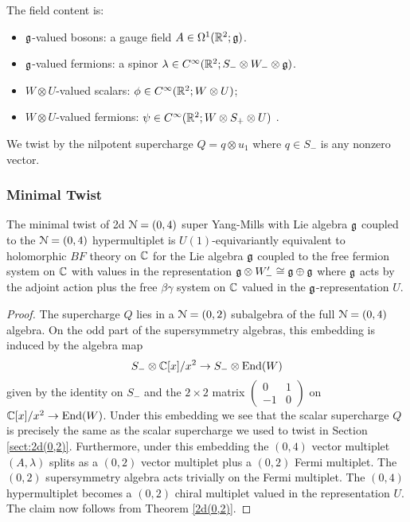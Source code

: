 \documentclass[10pt, oneside]{article}
\begin{document}
The field content is:
\begin{itemize}
\item $\mathfrak g$-valued bosons: a gauge field $A \in \Omega^1(\mathbb R^2;\mathfrak g)$.
\item $\mathfrak g$-valued fermions: a spinor $\lambda \in C^\infty(\mathbb R^2 ; S_- \otimes W_- \otimes \mathfrak g)$. 
\item $W \otimes U$-valued scalars: $\phi \in C^\infty(\mathbb R^2 ; W \otimes U)$;
\item $W \otimes U$-valued fermions: $\psi \in C^\infty(\mathbb R^2 ; W \otimes S_+ \otimes U)$ .
\end{itemize}

We twist by the nilpotent supercharge $Q = q \otimes u_1$ where $q \in S_-$ is any nonzero vector. 

\subsubsection{Minimal Twist} \label{sect:2d04minimaltwist}

\begin{theorem}\label{2d(0,4)}
The minimal twist of 2d $\mathcal N=(0,4)$ super Yang-Mills with Lie algebra $\mathfrak g$ coupled to the $\mathcal N=(0,4)$ hypermultiplet is $U(1)$-equivariantly equivalent to holomorphic $BF$ theory on $\mathbb C$ for the Lie algebra $\mathfrak g$ coupled to the free fermion system on $\mathbb C$ with values in the representation $\mathfrak g \otimes W_-' \cong \mathfrak g \oplus \mathfrak g$ where $\mathfrak g$ acts by the adjoint action plus the free $\beta\gamma$ system on $\mathbb C$ valued in the $\mathfrak g$-representation $U$. 
\end{theorem}

\begin{proof}
The supercharge $Q$ lies in a $\mathcal N = (0,2)$ subalgebra of the full $\mathcal N = (0,4)$ algebra.
On the odd part of the supersymmetry algebras, this embedding is induced by the algebra map
\[
S_- \otimes \mathbb C[x] / x^2 \to S_- \otimes {\rm End}(W)
\]
given by the identity on $S_-$ and the $2 \times 2$ matrix $\begin{pmatrix} 0 &1 \\ -1 & 0 \end{pmatrix}$ on $\mathbb C[x]/x^2 \to {\rm End}(W)$. 
Under this embedding we see that the scalar supercharge $Q$ is precisely the same as the scalar supercharge we used to twist in Section \ref{sect:2d(0,2)}. 
Furthermore, under this embedding the $(0,4)$ vector multiplet $(A, \lambda)$ splits as a $(0,2)$ vector multiplet plus a $(0,2)$ Fermi multiplet. 
The $(0,2)$ supersymmetry algebra acts trivially on the Fermi multiplet. 
The $(0,4)$ hypermultiplet becomes a $(0,2)$ chiral multiplet valued in the representation $U$. 
The claim now follows from Theorem \ref{2d(0,2)}. 
\end{proof}
\end{document}
